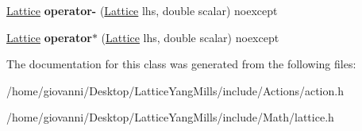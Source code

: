 \begin{DoxyCompactItemize}
\item 
\hyperlink{classLattice}{Lattice} {\bfseries operator-\/} (\hyperlink{classLattice}{Lattice} lhs, double scalar) noexcept\hypertarget{classLattice_a639c0b3a16e4da87bfcf35fbdc19cb77}{}\label{classLattice_a639c0b3a16e4da87bfcf35fbdc19cb77}

\item 
\hyperlink{classLattice}{Lattice} {\bfseries operator$\ast$} (\hyperlink{classLattice}{Lattice} lhs, double scalar) noexcept\hypertarget{classLattice_a718b8da2ada193995a48d9f6b2cebf5e}{}\label{classLattice_a718b8da2ada193995a48d9f6b2cebf5e}

\end{DoxyCompactItemize}


The documentation for this class was generated from the following files\+:\begin{DoxyCompactItemize}
\item 
/home/giovanni/\+Desktop/\+Lattice\+Yang\+Mills/include/\+Actions/action.\+h\item 
/home/giovanni/\+Desktop/\+Lattice\+Yang\+Mills/include/\+Math/lattice.\+h\end{DoxyCompactItemize}
